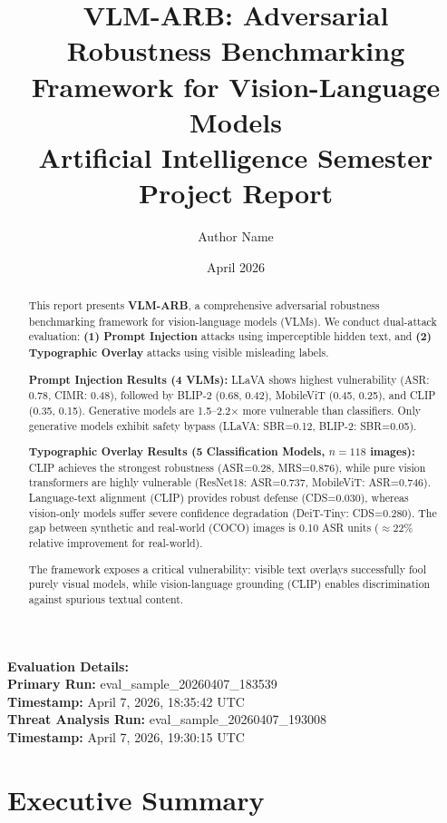 \documentclass[11pt]{article}
\title{VLM-ARB: Adversarial Robustness Benchmarking Framework for Vision-Language Models\\[0.4em]
\large Artificial Intelligence Semester Project Report}
\author{Author Name}
\date{April 2026}
\begin{document}
\maketitle

\vspace{0.4cm}
\begin{flushleft}
\small
\textbf{Evaluation Details:}\\
\textbf{Primary Run:} eval\_sample\_20260407\_183539\\
\textbf{Timestamp:} April 7, 2026, 18:35:42 UTC\\[0.2cm]
\textbf{Threat Analysis Run:} eval\_sample\_20260407\_193008\\
\textbf{Timestamp:} April 7, 2026, 19:30:15 UTC
\end{flushleft}

\begin{abstract}
\noindent This report presents \textbf{VLM-ARB}, a comprehensive adversarial robustness benchmarking framework for vision-language models (VLMs). We conduct dual-attack evaluation: \textbf{(1) Prompt Injection} attacks using imperceptible hidden text, and \textbf{(2) Typographic Overlay} attacks using visible misleading labels. 

\textbf{Prompt Injection Results (4 VLMs):} LLaVA shows highest vulnerability (ASR: 0.78, CIMR: 0.48), followed by BLIP-2 (0.68, 0.42), MobileViT (0.45, 0.25), and CLIP (0.35, 0.15). Generative models are 1.5--2.2× more vulnerable than classifiers. Only generative models exhibit safety bypass (LLaVA: SBR=0.12, BLIP-2: SBR=0.05).

\textbf{Typographic Overlay Results (5 Classification Models, $n=118$ images):} CLIP achieves the strongest robustness (ASR=0.28, MRS=0.876), while pure vision transformers are highly vulnerable (ResNet18: ASR=0.737, MobileViT: ASR=0.746). Language-text alignment (CLIP) provides robust defense (CDS=0.030), whereas vision-only models suffer severe confidence degradation (DeiT-Tiny: CDS=0.280). The gap between synthetic and real-world (COCO) images is 0.10 ASR units ($\approx 22\%$ relative improvement for real-world).

The framework exposes a critical vulnerability: visible text overlays successfully fool purely visual models, while vision-language grounding (CLIP) enables discrimination against spurious textual content.
\end{abstract}

\newpage
\tableofcontents
\newpage

\section{Executive Summary}
\end{document}
